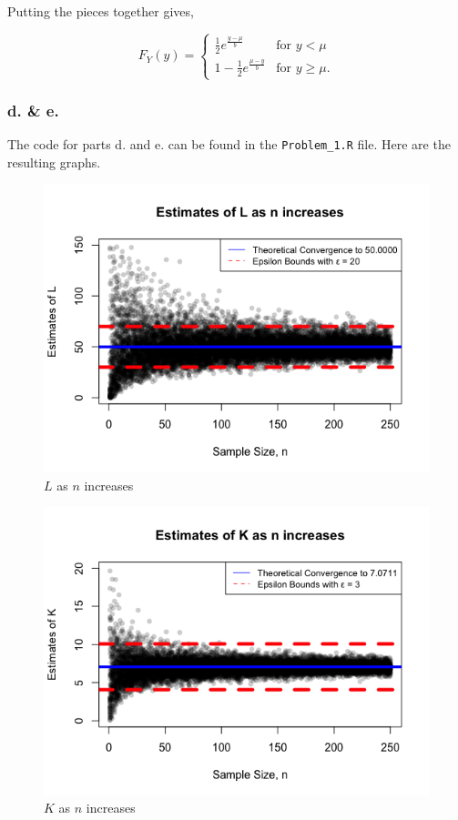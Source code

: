 \documentclass[12pt]{article}
\begin{document}
Putting the pieces together gives,

$$F_Y(y) = \begin{cases}
 \frac{1}{2} e^{\frac{y-\mu }{b}} & \text{for } y <\mu \\
1 - \frac{ 1 }{ 2 } e^{\frac{ \mu - y }{ b }} &  \text{for } y \geq\mu.
\end{cases}$$

\subsubsection{d. \& e.}

The code for parts d. and e. can be found in the \lstinline{Problem_1.R} file. Here are the resulting graphs.



\begin{figure}[H]
	\centering
	\includegraphics{img/n_vs_Ln.png}
	\caption{$L$ as $n$ increases}
\end{figure}

\begin{figure}[H]
	\centering
	\includegraphics{img/n_vs_Kn.png}
	\caption{$K$ as $n$ increases}
\end{figure}
\end{document}
